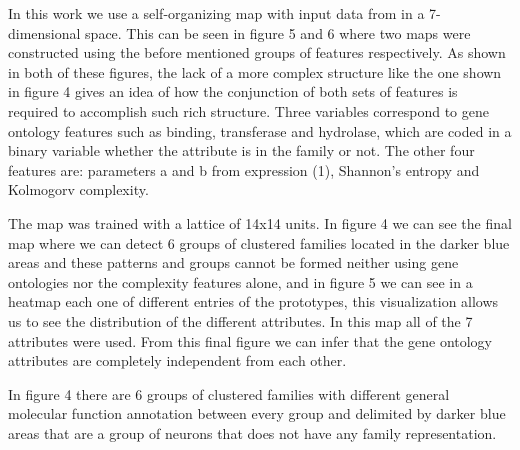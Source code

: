 \documentclass[preprint,12pt]{elsarticle}
\begin{document}
In this work we use a self-organizing map with input data from in a 7-dimensional space. This can be seen in figure 5 and 6 where two maps were constructed using the before mentioned groups of features respectively.  As shown in both of these figures, the lack of a more complex structure like the one shown in figure 4 gives an idea of how the conjunction of both sets of features is required to accomplish such rich structure. Three variables correspond to gene ontology features such as binding, transferase and hydrolase, which are coded in a binary variable whether the attribute is in the family or not. The other four features are: parameters a and b from expression (1),  Shannon’s entropy and Kolmogorv complexity. \par The map was trained with a lattice of 14x14 units. In figure 4 we can see the final map where we can detect 6 groups of clustered families located in the darker blue areas and these patterns and groups cannot be formed neither using gene ontologies  nor the complexity features alone, and in figure 5 we can see in a heatmap each one of different entries of the prototypes, this visualization allows us to see the distribution of the different attributes. In this map all of the 7 attributes were used. From this final figure we can infer that the gene ontology attributes are completely independent from each other. 
\par In figure 4 there are 6 groups of clustered families with different general molecular function annotation between every group and delimited by darker blue areas that are a group of neurons that does not have any family representation. 
\end{document}
